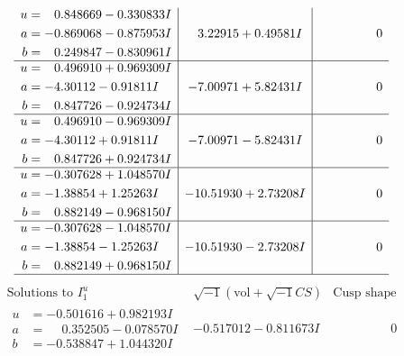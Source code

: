 \documentclass[1p]{elsarticle_modified}
\theoremstyle{definition}
\newcommand{\I}{\sqrt{-1}}
\begin{document}
$$\begin{array}{c|c|c}
\begin{aligned}
u &= \phantom{-}0.848669 - 0.330833 I \\
a &= -0.869068 - 0.875953 I \\
b &= \phantom{-}0.249847 - 0.830961 I\end{aligned}
 & \phantom{-}3.22915 + 0.49581 I & \phantom{-0.000000 } 0 \\ \hline\begin{aligned}
u &= \phantom{-}0.496910 + 0.969309 I \\
a &= -4.30112 - 0.91811 I \\
b &= \phantom{-}0.847726 - 0.924734 I\end{aligned}
 & -7.00971 + 5.82431 I & \phantom{-0.000000 } 0 \\ \hline\begin{aligned}
u &= \phantom{-}0.496910 - 0.969309 I \\
a &= -4.30112 + 0.91811 I \\
b &= \phantom{-}0.847726 + 0.924734 I\end{aligned}
 & -7.00971 - 5.82431 I & \phantom{-0.000000 } 0 \\ \hline\begin{aligned}
u &= -0.307628 + 1.048570 I \\
a &= -1.38854 + 1.25263 I \\
b &= \phantom{-}0.882149 - 0.968150 I\end{aligned}
 & -10.51930 + 2.73208 I & \phantom{-0.000000 } 0 \\ \hline\begin{aligned}
u &= -0.307628 - 1.048570 I \\
a &= -1.38854 - 1.25263 I \\
b &= \phantom{-}0.882149 + 0.968150 I\end{aligned}
 & -10.51930 - 2.73208 I & \phantom{-0.000000 } 0\\
 \hline 
 \end{array}$$\newpage$$\begin{array}{c|c|c}  
\text{Solutions to }I^u_{1}& \I (\text{vol} + \sqrt{-1}CS) & \text{Cusp shape}\\
 \hline 
\begin{aligned}
u &= -0.501616 + 0.982193 I \\
a &= \phantom{-}0.352505 - 0.078570 I \\
b &= -0.538847 + 1.044320 I\end{aligned}
 & -0.517012 - 0.811673 I & \phantom{-0.000000 } 0 \\ \hline\begin{aligned}

\end{aligned}
\end{array}$$
\end{document}
